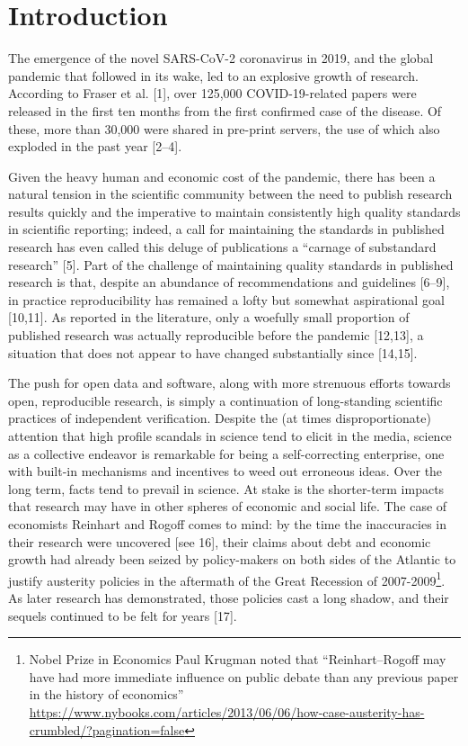 \documentclass[10pt,letterpaper]{article}
\begin{document}
\linenumbers

\hypertarget{introduction}{%
\section{Introduction}\label{introduction}}

The emergence of the novel SARS-CoV-2 coronavirus in 2019, and the
global pandemic that followed in its wake, led to an explosive growth of
research. According to Fraser et al. {[}1{]}, over 125,000
COVID-19-related papers were released in the first ten months from the
first confirmed case of the disease. Of these, more than 30,000 were
shared in pre-print servers, the use of which also exploded in the past
year {[}2--4{]}.

Given the heavy human and economic cost of the pandemic, there has been
a natural tension in the scientific community between the need to
publish research results quickly and the imperative to maintain
consistently high quality standards in scientific reporting; indeed, a
call for maintaining the standards in published research has even called
this deluge of publications a ``carnage of substandard research''
{[}5{]}. Part of the challenge of maintaining quality standards in
published research is that, despite an abundance of recommendations and
guidelines {[}6--9{]}, in practice reproducibility has remained a lofty
but somewhat aspirational goal {[}10,11{]}. As reported in the
literature, only a woefully small proportion of published research was
actually reproducible before the pandemic {[}12,13{]}, a situation that
does not appear to have changed substantially since {[}14,15{]}.

The push for open data and software, along with more strenuous efforts
towards open, reproducible research, is simply a continuation of
long-standing scientific practices of independent verification. Despite
the (at times disproportionate) attention that high profile scandals in
science tend to elicit in the media, science as a collective endeavor is
remarkable for being a self-correcting enterprise, one with built-in
mechanisms and incentives to weed out erroneous ideas. Over the long
term, facts tend to prevail in science. At stake is the shorter-term
impacts that research may have in other spheres of economic and social
life. The case of economists Reinhart and Rogoff comes to mind: by the
time the inaccuracies in their research were uncovered {[}see 16{]},
their claims about debt and economic growth had already been seized by
policy-makers on both sides of the Atlantic to justify austerity
policies in the aftermath of the Great Recession of
2007-2009\footnote{Nobel Prize in Economics Paul Krugman noted that
  ``Reinhart--Rogoff may have had more immediate influence on public
  debate than any previous paper in the history of economics''
  \url{https://www.nybooks.com/articles/2013/06/06/how-case-austerity-has-crumbled/?pagination=false}}.
As later research has demonstrated, those policies cast a long shadow,
and their sequels continued to be felt for years {[}17{]}.
\end{document}
